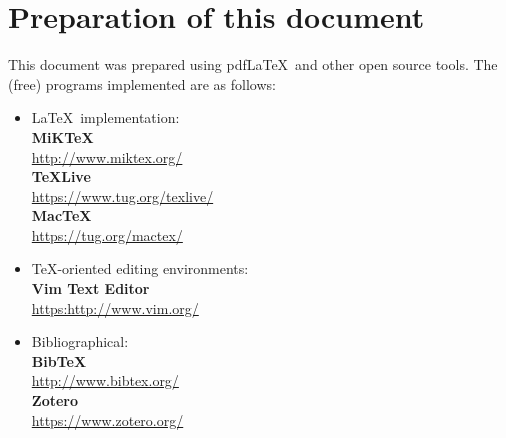 \chapter{Preparation of this document}
This document was prepared using pdf\LaTeX\ and other open source tools. The (free) programs implemented are as follows:

\begin{itemize}
\item \LaTeX\ implementation:\\
  \textbf{MiK\TeX}\\
  \href{http://www.miktex.org/}{http://www.miktex.org/}\\
  \textbf{\TeX}\textbf{Live}\\
  \href{https://www.tug.org/texlive/}{https://www.tug.org/texlive/}\\
  \textbf{Mac}\textbf{\TeX}\\
  \href{https://tug.org/mactex/}{https://tug.org/mactex/}\\
\item \TeX-oriented editing environments:\\
  \textbf{Vim Text Editor}\\
  \href{https://http://www.vim.org/}{https:http://www.vim.org/}\\
\item Bibliographical:\\
  \textbf{Bib}\textbf{\TeX}\\
  \href{http://www.bibtex.org/}{http://www.bibtex.org/}\\
  \textbf{Zotero}\\
  \href{https://www.zotero.org/}{https://www.zotero.org/}\\
\end{itemize}
